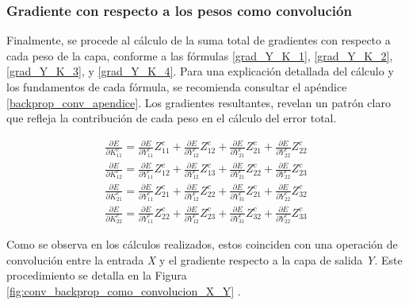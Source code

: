 \subsubsection{Gradiente con respecto a los pesos como convolución}

Finalmente, se procede al cálculo de la suma total de gradientes con respecto a cada peso de la capa, conforme a las fórmulas \ref{grad_Y_K_1}, \ref{grad_Y_K_2}, \ref{grad_Y_K_3}, y \ref{grad_Y_K_4}. Para una explicación detallada del cálculo y los fundamentos de cada fórmula, se recomienda consultar el apéndice \ref{backprop_conv_apendice}. Los gradientes resultantes, revelan un patrón claro que refleja la contribución de cada peso en el cálculo del error total.

\begin{gather}
	\frac{\partial E}{\partial K^c_{11}} = \frac{\partial E}{\partial Y^c_{11}} Z^c_{11} + \frac{\partial E}{\partial Y^c_{12}} Z^c_{12} + \frac{\partial E}{\partial Y^c_{21}} Z^c_{21} + \frac{\partial E}{\partial Y^c_{22}} Z^c_{22} \label{grad_Y_K_1} \\
	\frac{\partial E}{\partial K^c_{12}} = \frac{\partial E}{\partial Y^c_{11}} Z^c_{12} + \frac{\partial E}{\partial Y^c_{12}} Z^c_{13} + \frac{\partial E}{\partial Y^c_{21}} Z^c_{22} + \frac{\partial E}{\partial Y^c_{22}} Z^c_{23} \label{grad_Y_K_2} \\	
	\frac{\partial E}{\partial K^c_{21}} = \frac{\partial E}{\partial Y^c_{11}} Z^c_{21} + \frac{\partial E}{\partial Y^c_{12}} Z^c_{22} + \frac{\partial E}{\partial Y^c_{31}} Z^c_{21} + \frac{\partial E}{\partial Y^c_{22}} Z^c_{32} \label{grad_Y_K_3} \\
	\frac{\partial E}{\partial K^c_{22}} = \frac{\partial E}{\partial Y^c_{11}} Z^c_{22} + \frac{\partial E}{\partial Y^c_{12}} Z^c_{23} + \frac{\partial E}{\partial Y^c_{31}} Z^c_{32} + \frac{\partial E}{\partial Y^c_{22}} Z^c_{33} \label{grad_Y_K_4}
\end{gather}

Como se observa en los cálculos realizados, estos coinciden con una operación de convolución entre la entrada \textit{X} y el gradiente respecto a la capa de salida \textit{Y}. Este procedimiento se detalla en la Figura \ref{fig:conv_backprop_como_convolucion_X_Y} \cite{conv_backprop}.

